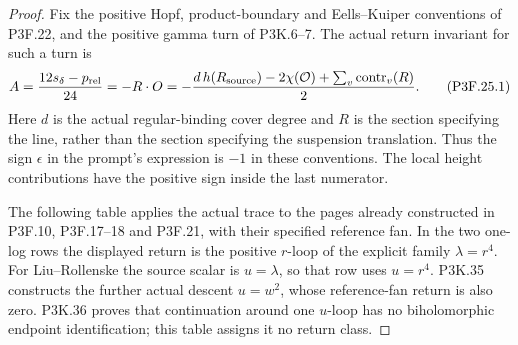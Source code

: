 \begin{proof}
Fix the positive Hopf, product-boundary and Eells--Kuiper conventions of P3F.22, and the positive gamma turn of P3K.6--7. The actual return invariant for such a turn is \[
 A=\frac{12s_\delta-p_{\rm rel}}{24}
   =-R\cdot O
   =-\frac{d\,h(R_{\rm source})-2\chi(\mathcal O)
                  +\sum_v\operatorname{contr}_v(R)}2. \tag{P3F.25.1}
\] Here \(d\) is the actual regular-binding cover degree and \(R\) is the section specifying the line, rather than the section specifying the suspension translation. Thus the sign \(\epsilon\) in the prompt's expression is \(-1\) in these conventions. The local height contributions have the positive sign inside the last numerator.

The following table applies the actual trace to the pages already constructed in P3F.10, P3F.17--18 and P3F.21, with their specified reference fan. In the two one-log rows the displayed return is the positive \(r\)-loop of the explicit family \(\lambda=r^4\). For Liu--Rollenske the source scalar is \(u=\lambda\), so that row uses \(u=r^4\). P3K.35 constructs the further actual descent \(u=w^2\), whose reference-fan return is also zero. P3K.36 proves that continuation around one \(u\)-loop has no biholomorphic endpoint identification; this table assigns it no return class.


\end{proof}

